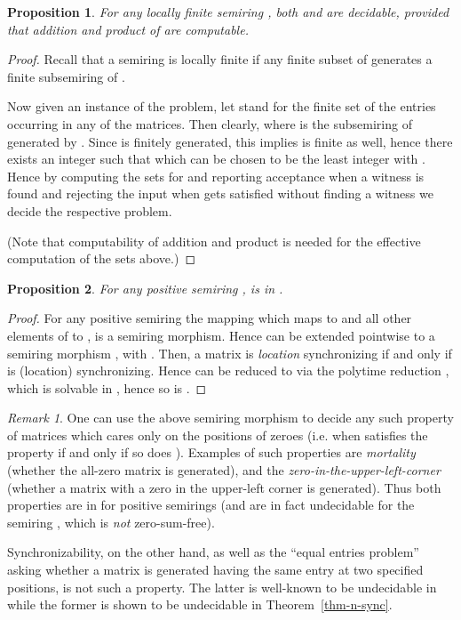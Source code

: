 \documentclass[submission,copyright,creativecommons]{eptcs}
\theoremstyle{plain}
\newtheorem{proposition}{Proposition}
\theoremstyle{definition}
\theoremstyle{remark}
\newtheorem{remark}{Remark}
\begin{document}
\begin{proposition}
For any locally finite semiring , both  and
 are decidable, provided that addition and product of  are computable.
\end{proposition}
\begin{proof}
Recall that a semiring  is locally finite if any finite subset of  generates a finite subsemiring of .

Now given an instance  of the problem,
let  stand for the finite set of the entries occurring in any of the matrices.
Then clearly,  where  is the subsemiring of 
generated by .
Since  is finitely generated, this
implies  is finite as well, hence there exists an integer  such that  which can be chosen to be the least integer 
 with . Hence by computing the sets  for 
and reporting acceptance when a witness is found and rejecting the input when 
gets satisfied without finding a witness we decide the respective problem.

(Note that computability of addition and product is needed for the effective computation of the sets above.)
\end{proof}

\begin{proposition}
\label{prop-zsf-zdf}
For any positive semiring ,  is in .
\end{proposition}
\begin{proof}
For any positive semiring  the mapping  which maps  to  and all other elements of  to ,
is a semiring morphism. Hence  can be extended pointwise to a semiring morphism ,
with . Then, a matrix  is \emph{location} synchronizing if and only if
 is (location) synchronizing. Hence  can be reduced to 
via the polytime reduction , which is solvable in ,
hence so is .
\end{proof}
\begin{remark}
One can use the above semiring morphism to decide any such property of matrices which cares only on the positions of zeroes
(i.e. when  satisfies the property if and only if so does ).
Examples of such properties are \emph{mortality} (whether the all-zero matrix is generated),
and the \emph{zero-in-the-upper-left-corner} (whether a matrix with a zero in the upper-left corner is generated).
Thus both properties are in  for positive semirings
(and are in fact undecidable for the semiring , which is \emph{not} zero-sum-free).

Synchronizability, on the other hand, as well as the ``equal entries problem'' asking whether a matrix is generated having
the same entry at two specified positions, is not such a property. The latter is well-known to be undecidable in 
while the former is shown to be undecidable in Theorem~\ref{thm-n-sync}.
\end{remark}
\end{document}
